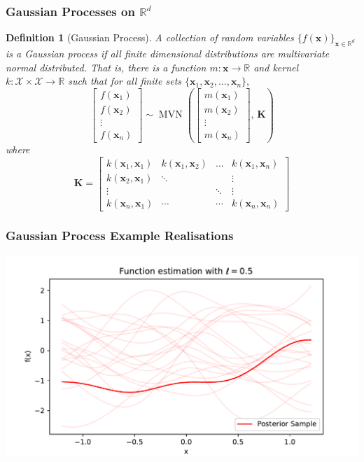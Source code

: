 \documentclass{beamer}
\DeclareMathOperator{\MVN}{MVN}
\newcommand{\R}{\mathbb{R}}
\newtheorem{definnn}{Definition}
\begin{document}
\begin{frame}
    \frametitle{Gaussian Processes on $\mathbb{R}^d$}
    \begin{definnn}[Gaussian Process]
        A collection of random variables $\{f(\mathbf{x})\}_{\mathbf{x}\in\mathbb{R}^d}$ 
        is a \emph{Gaussian process} if all finite dimensional distributions are 
        multivariate normal distributed. That is, there is a function 
        $m:\mathcal{\mathbf{x}}\to\R$ and kernel $k:\mathcal{X}\times\mathcal{X}\to \R$ 
        such that for all finite sets $\{\mathbf{x}_1, \mathbf{x}_2, \dots, \mathbf{x}_n\},$
        $$\begin{bmatrix}
                f(\mathbf{x}_1) \\ f(\mathbf{x}_2)\\ \vdots\\ f(\mathbf{x}_n)
            \end{bmatrix} \sim
            \MVN\left(\begin{bmatrix}
                m(\mathbf{x}_1) \\ m(\mathbf{x}_2)\\ \vdots\\ m(\mathbf{x}_n)
            \end{bmatrix},\, \mathbf{K}\right)$$
        where $$\mathbf{K} = \begin{bmatrix}
                k(\mathbf{x}_1, \mathbf{x}_1) & k(\mathbf{x}_1, \mathbf{x}_2) & \dots  & k(\mathbf{x}_1, \mathbf{x}_n) \\
                k(\mathbf{x}_2, \mathbf{x}_1) & \ddots                        &        & \vdots                        \\
                \vdots                        &                               & \ddots & \vdots                        \\
                k(\mathbf{x}_n, \mathbf{x}_1) & \cdots                        & \cdots & k(\mathbf{x}_n, \mathbf{x}_n)
            \end{bmatrix}$$
    \end{definnn}
\end{frame}

\begin{frame}
    \frametitle{Gaussian Process Example Realisations}
    \includegraphics[width=\textwidth]{exponentiated_ell_5_tenths.pdf}
\end{frame}
\end{document}

